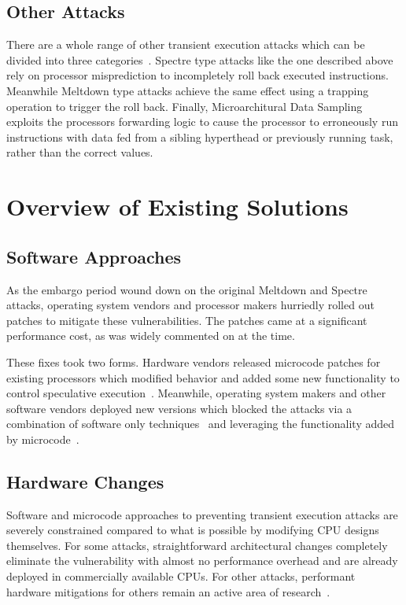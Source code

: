 \subsection*{Other Attacks}
There are a whole range of other transient execution attacks which can be divided into three categories~\cite{hill:survey}.
Spectre type attacks like the one described above rely on processor misprediction to incompletely roll back executed instructions.
Meanwhile Meltdown type attacks achieve the same effect using a trapping operation to trigger the roll back.
Finally, Microarchitural Data Sampling exploits the processors forwarding logic to cause the processor to erroneously run instructions with data fed from a sibling hyperthead or previously running task, rather than the correct values.

\section*{Overview of Existing Solutions}
\subsection*{Software Approaches}
As the embargo period wound down on the original Meltdown and Spectre attacks, operating system vendors and processor makers hurriedly rolled out patches to mitigate these vulnerabilities.
The patches came at a significant performance cost, as was widely commented on at the time. 

These fixes took two forms.
Hardware vendors released microcode patches for existing processors which modified behavior and added some new functionality to control speculative execution~\cite{intel:l1tf}.
Meanwhile, operating system makers and other software vendors deployed new versions which blocked the attacks via a combination of software only techniques~\cite{intel:retpoline, linux:kpti} and leveraging the functionality added by microcode~\cite{intel:l1tf}.

\subsection*{Hardware Changes}
Software and microcode approaches to preventing transient execution attacks are severely constrained compared to what is possible by modifying CPU designs themselves.
For some attacks, straightforward architectural changes completely eliminate the vulnerability with almost no performance overhead and are already deployed in commercially available CPUs.
For other attacks, performant hardware mitigations for others remain an active area of research~\cite{OISA, ConTExT}.

